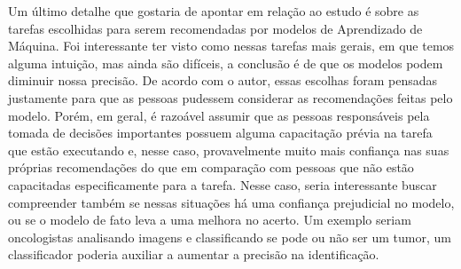 \documentclass[11221709.tex]{subfiles}
\begin{document}
    Um último detalhe que gostaria de apontar em relação ao estudo é
    sobre as tarefas escolhidas para serem recomendadas por modelos
    de Aprendizado de Máquina. Foi interessante ter visto como
    nessas tarefas mais gerais, em que temos alguma intuição, mas
    ainda são difíceis, a conclusão é de que os modelos podem
    diminuir nossa precisão. De acordo com o autor, essas escolhas
    foram pensadas justamente para que as pessoas pudessem
    considerar as recomendações feitas pelo modelo. Porém, em geral,
    é razoável assumir que as pessoas responsáveis pela tomada de
    decisões importantes possuem alguma capacitação prévia na tarefa
    que estão executando e, nesse caso, provavelmente muito mais
    confiança nas suas próprias recomendações do que em comparação
    com pessoas que não estão capacitadas especificamente para a
    tarefa. Nesse caso, seria interessante buscar compreender também
    se nessas situações há uma confiança prejudicial no modelo, ou
    se o modelo de fato leva a uma melhora no acerto. Um exemplo
    seriam oncologistas analisando imagens e classificando se pode
    ou não ser um tumor, um classificador poderia auxiliar a
    aumentar a precisão na identificação.



\end{document}
